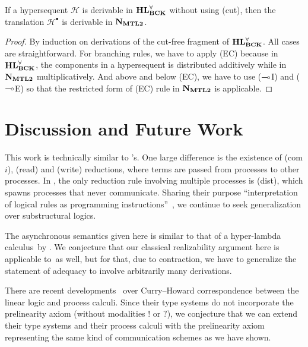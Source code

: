 \begin{proposition}[Completeness]
 \label{prop:comp}
 If a hypersequent $\mathcal H$ is
 derivable in $\mathbf{HL}^\forall_{\mathbf{BCK}}$ without using (cut), then the translation $\mathcal H^\bullet$ is
 derivable in $\mathbf{N}_{\mathbf{MTL2}}$.
\end{proposition}
\begin{proof}
 By induction on derivations of the cut-free fragment of $\mathbf{HL}^\forall_{\mathbf{BCK}}$.
 All cases are straightforward.  For branching rules, we have to apply
 (EC) because in $\mathbf{HL}^\forall_{\mathbf{BCK}}$, the components in a hypersequent is distributed
 additively while in $\mathbf{N}_{\mathbf{MTL2}}$ multiplicatively.  And above and below
 (EC), we have to use ($\multimap$I) and ($\multimap$E) so that the
 restricted form of (EC) rule in $\mathbf{N}_{\mathbf{MTL2}}$ is applicable.
\end{proof}

\section{Discussion and Future Work}
\label{sec:discuss}
This work is technically similar to \citet{danos-krivine}'s.
One large difference is the existence of (com$i$), (read) and (write)
reductions, where terms are passed from processes to other
processes.
In \citep{danos-krivine}, the only reduction rule involving multiple
processes is (dist), which spawns processes that never communicate.
Sharing their purpose
``interpretation of logical rules as programming
instructions''~\citep{danos-krivine},
we continue to seek generalization over substructural
logics.

The asynchronous semantics given here is similar to that of a
hyper-lambda calculus \lgd\,by
\citet{hiraiflops2012}.
We conjecture that our classical realizability argument here is
applicable to \lgd\,as well, but for that, due to contraction,
we have to generalize the statement of adequacy to involve arbitrarily
many derivations.

There are recent
developments~\citep{pfenning2010,wadler2012propositions} over
Curry--Howard correspondence between
the linear logic and process
calculi.
Since their type systems do not incorporate the prelinearity axiom
(without modalities $!$ or $?$),
we conjecture that we can extend their type systems and their process
calculi
with the prelinearity
axiom representing the same kind of communication schemes as we have shown.


